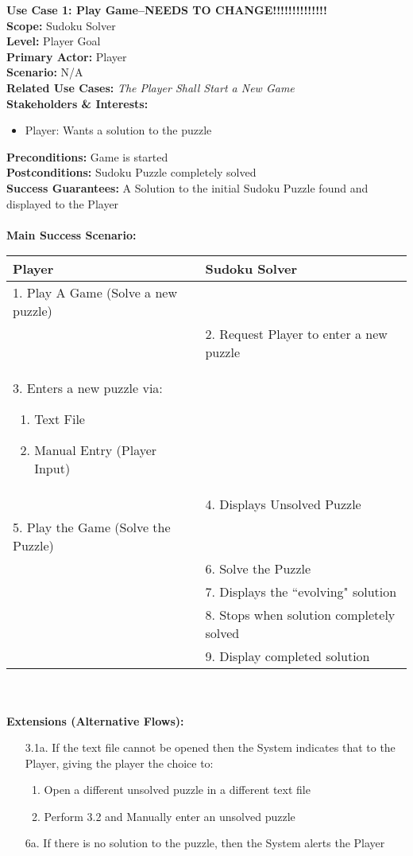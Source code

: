 \documentclass[letterpaper]{article}
\begin{document}
\noindent
\textbf{Use Case 1:  Play Game--NEEDS TO CHANGE!!!!!!!!!!!!!!}\\
\textbf{Scope:  }Sudoku Solver\\
\textbf{Level:  }Player Goal\\
\textbf{Primary Actor:  }Player\\
\textbf{Scenario:  }N/A\\
\textbf{Related Use Cases:  }\textit{The Player Shall Start a
New Game}\\
\textbf{Stakeholders \& Interests:}
\begin{itemize}
\item  Player:  Wants a solution to the puzzle
\end{itemize}
\textbf{Preconditions:  }Game is started\\
\textbf{Postconditions:  }Sudoku Puzzle completely solved\\
\textbf{Success Guarantees:  }A Solution to the initial Sudoku Puzzle
found and displayed to the Player\\\\
\textbf{Main Success Scenario:  }\\
\begin{tabular}{|p{5.75cm}|p{5.75cm}|}\hline
\textbf{Player} & \textbf{Sudoku Solver}\\\hline
1.  Play A Game (Solve a new puzzle) & \\\hline
& 2.  Request Player to enter a new puzzle\\\hline
3.  Enters a new puzzle via:
\begin{enumerate}
\item Text File
\item Manual Entry (Player Input)
\end{enumerate} & \\\hline
& 4.  Displays Unsolved Puzzle\\\hline
5.  Play the Game (Solve the Puzzle) &\\\hline
& 6. Solve the Puzzle\\\hline
& 7. Displays the ``evolving" solution\\\hline
& 8. Stops when solution completely solved\\\hline
& 9. Display completed solution\\\hline
\end{tabular}\\\\
\textbf{Extensions (Alternative Flows):}
\begin{itemize}
\item[3.1a.]If the text file cannot be opened then the System
indicates that to the Player, giving the player the choice to:
\begin{enumerate}
\item Open a different unsolved puzzle in a different text file
\item Perform 3.2 and Manually enter an unsolved puzzle
\end{enumerate}
\item[6a.]If there is no solution to the puzzle, then the System
alerts the Player
\end{itemize}
\end{document}
